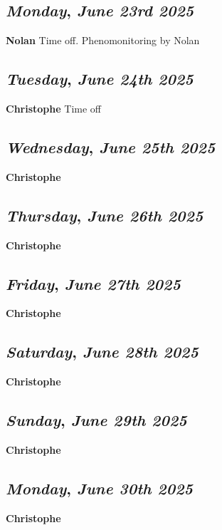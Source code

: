 \def\day{\textit{June 23rd 2025}}
\def\weekday{\textit{Monday}}
\subsection*{\weekday, \day}
\textbf {Nolan}
Time off. Phenomonitoring by Nolan
\def\day{\textit{June 24th 2025}}
\def\weekday{\textit{Tuesday}}
\subsection*{\weekday, \day}
\textbf {Christophe}
Time off
\def\day{\textit{June 25th 2025}}
\def\weekday{\textit{Wednesday}}
\subsection*{\weekday, \day}
\textbf {Christophe}

\def\day{\textit{June 26th 2025}}
\def\weekday{\textit{Thursday}}
\subsection*{\weekday, \day}
\textbf {Christophe}

\def\day{\textit{June 27th 2025}}
\def\weekday{\textit{Friday}}
\subsection*{\weekday, \day}
\textbf {Christophe}

\def\day{\textit{June 28th 2025}}
\def\weekday{\textit{Saturday}}
\subsection*{\weekday, \day}
\textbf {Christophe}

\def\day{\textit{June 29th 2025}}
\def\weekday{\textit{Sunday}}
\subsection*{\weekday, \day}
\textbf {Christophe}

\def\day{\textit{June 30th 2025}}
\def\weekday{\textit{Monday}}
\subsection*{\weekday, \day}
\textbf {Christophe}
